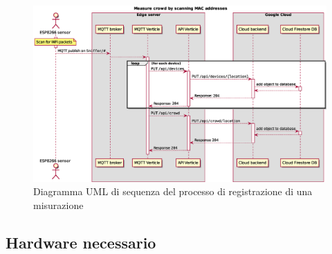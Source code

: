 \begin{figure}[H]
  \centering
  \includegraphics[width=\textwidth]{res/out/measure.eps}
  \caption{Diagramma UML di sequenza del processo di registrazione di una misurazione}%
  \label{fig:measure}
\end{figure}

\subsection{Hardware necessario}
